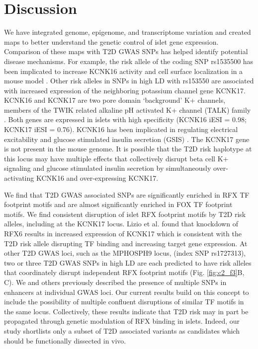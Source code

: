 \section{Discussion}
We have integrated genome, epigenome, and transcriptome variation and created maps to better understand the genetic control of islet gene expression. Comparison of these maps with T2D GWAS SNPs has helped identify potential disease mechanisms. For example, the risk allele of the coding SNP rs1535500 has been implicated to increase KCNK16 activity and cell surface localization in a mouse model \cite{vierraTypeDiabetesAssociated2015}. Other risk alleles in SNPs in high LD with rs153550 are associated with increased expression of the neighboring potassium channel gene KCNK17. KCNK16 and KCNK17 are two pore domain ‘background’ K+ channels, members of the TWIK related alkaline pH activated K+ channel (TALK) family \cite{girardGenomicFunctionalCharacteristics2001, lotshawBiophysicalPharmacologicalFunctional2007a}. Both genes are expressed in islets with high specificity (KCNK16 iESI = 0.98; KCNK17 iESI = 0.76). KCNK16 has been implicated in regulating electrical excitability and glucose stimulated insulin secretion (GSIS)  \cite{vierraTypeDiabetesAssociated2015}. The KCNK17 gene is not present in the mouse genome. It is possible that the T2D risk haplotype at this locus may have multiple effects that collectively disrupt beta cell K+ signaling and glucose stimulated insulin secretion by simultaneously over-activating KCNK16 and over-expressing KCNK17.

We find that T2D GWAS associated SNPs are significantly enriched in RFX TF footprint motifs and are almost significantly enriched in FOX TF footprint motifs. We find consistent disruption of islet RFX footprint motifs by T2D risk alleles, including at the KCNK17 locus. Lizio et al. found that knockdown of RFX6 results in increased expression of KCNK17 \cite{lizioMappingMammalianCelltypespecific2015} which is consistent with the T2D risk allele disrupting TF binding and increasing target gene expression. At other T2D GWAS loci, such as the MPHOSPH9 locus, (index SNP rs1727313), two or three T2D GWAS SNPs in high LD are each predicted to have risk alleles that coordinately disrupt independent RFX footprint motifs (Fig. \ref{fig:c2_f3}B, C).  We and others \cite{parkerChromatinStretchEnhancer2013, corradinCombinatorialEffectsMultiple2014, guoCoordinatedRegulatoryVariation2015} previously described the presence of multiple SNPs in enhancers at individual GWAS loci. Our current results build on this concept to include the possibility of multiple confluent disruptions of similar TF motifs in the same locus. Collectively, these results indicate that T2D risk may in part be propagated through genetic modulation of RFX binding in islets. Indeed, our study shortlists only a subset of T2D associated variants as candidates which should be functionally dissected in vivo.

